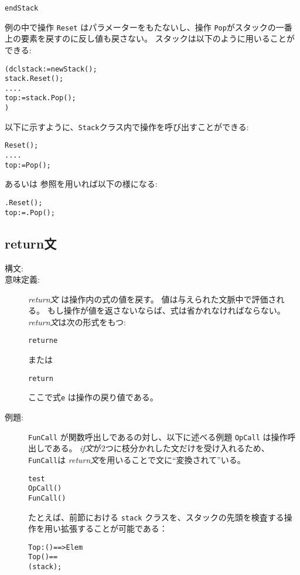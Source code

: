 \documentclass[\pformat,12pt]{jarticle}
\begin{document}
\begin{description}
\begin{alltt}
  end Stack
  \end{alltt}

例の中で操作 {\tt Reset} はパラメーターをもたないし、操作 {\tt Pop}がスタックの一番上の要素を戻すのに反し値も戻さない。 
スタックは以下のように用いることができる:
  \begin{alltt}
    ( dcl stack := new Stack();
      stack.Reset();
      ....
      top := stack.Pop();
    )
  \end{alltt}
 
 以下に示すように、{\tt Stack}クラス内で操作を呼び出すことができる:   
  \begin{alltt}
    Reset();
    ....
    top := Pop();
  \end{alltt}
  
 あるいは  参照を用いれば以下の様になる:
  \begin{alltt}
    .Reset();
    top := .Pop();
  \end{alltt}

\end{description}

\subsection{return文}

\begin{description}
\item[構文:]


\item[意味定義:]  {\it return文} は操作内の式の値を戻す。
値は与えられた文脈中で評価される。
もし操作が値を返さないならば、式は省かれなければならない。
 {\it return文\/}は次の形式をもつ:
  \begin{alltt}
    return e
  \end{alltt}
または
  \begin{alltt}
    return
  \end{alltt}
 ここで式{\tt e} は操作の戻り値である。

\item[例題:]  {\tt FunCall} が関数呼出しであるの対し、以下に述べる例題 {\tt OpCall} は操作呼出しである。
 {\it if文\/}が2つに枝分かれした文だけを受け入れるため、 {\tt FunCall}は  {\it return文}を用いることで文に``変換されて''いる。
  \begin{alltt}
     test
     OpCall()
      FunCall()
  \end{alltt}
  たとえば、前節における \texttt{stack} クラスを、スタックの先頭を検査する操作を用い拡張することが可能である：
\begin{alltt}
  \PUBLIC Top : () ==> Elem
  Top() ==
     ( stack);
\end{alltt}

\end{description}
\end{document}
